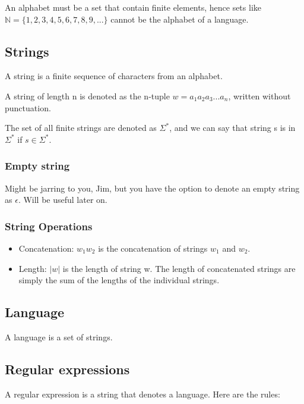 \documentclass{article}
\begin{document}
An alphabet must be a set that contain finite elements,
hence sets like $\mathbb{N} = \{1,2,3,4,5,6,7,8,9,...\}$ cannot be the alphabet of a language.

\subsection{Strings}

A string is a finite sequence of characters from an alphabet.

A string of length n is denoted as the n-tuple $w = a_1a_2a_3...a_n$, written without punctuation.

The set of all finite strings are denoted as $\Sigma^*$, and we can say that string s is in $\Sigma^*$ if $s \in \Sigma^*$.

\subsubsection{Empty string}

Might be jarring to you, Jim, but you have the option to denote an empty string as $\epsilon$. Will be useful later on.

\subsubsection{String Operations}

\begin{itemize}
    \item Concatenation: $w_1w_2$ is the concatenation of strings $w_1$ and $w_2$.
    \item Length: $|w|$ is the length of string w. The length of concatenated strings are simply the sum of the lengths of the individual strings.
\end{itemize}

\subsection{Language}

A language is a set of strings.

\subsection{Regular expressions}

A regular expression is a string that denotes a language. Here are the rules:
\end{document}
